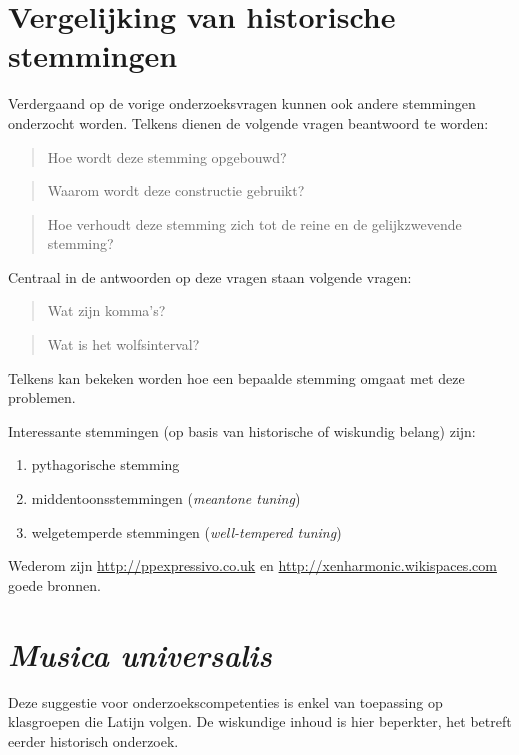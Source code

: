 \documentclass[10pt,a4paper]{article}
\begin{document}
\section{Vergelijking van historische stemmingen}
Verdergaand op de vorige onderzoeksvragen kunnen ook andere stemmingen onderzocht worden. Telkens dienen de volgende vragen beantwoord te worden:
\begin{quote}
  Hoe wordt deze stemming opgebouwd?
\end{quote}
\begin{quote}
  Waarom wordt deze constructie gebruikt?
\end{quote}
\begin{quote}
  Hoe verhoudt deze stemming zich tot de reine en de gelijkzwevende stemming?
\end{quote}
Centraal in de antwoorden op deze vragen staan volgende vragen:
\begin{quote}
  Wat zijn komma's?
\end{quote}
\begin{quote}
  Wat is het wolfsinterval?
\end{quote}
Telkens kan bekeken worden hoe een bepaalde stemming omgaat met deze problemen.

Interessante stemmingen (op basis van historische of wiskundig belang) zijn:
\begin{enumerate}
  \item pythagorische stemming
  \item middentoonsstemmingen (\emph{meantone tuning})
  \item welgetemperde stemmingen (\emph{well-tempered tuning})
\end{enumerate}

Wederom zijn \url{http://ppexpressivo.co.uk} en \url{http://xenharmonic.wikispaces.com} goede bronnen.


\section{\emph{Musica universalis}}
Deze suggestie voor onderzoekscompetenties is enkel van toepassing op klasgroepen die Latijn volgen. De wiskundige inhoud is hier beperkter, het betreft eerder historisch onderzoek.
\end{document}
